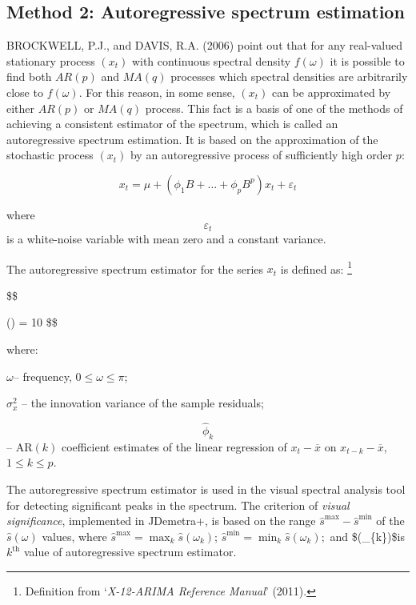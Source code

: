 \documentclass[
  letterpaper,
  DIV=11,
  numbers=noendperiod]{scrreprt}
\begin{document}
\hypertarget{method-2-autoregressive-spectrum-estimation}{%
\subsection{Method 2: Autoregressive spectrum
estimation}\label{method-2-autoregressive-spectrum-estimation}}

BROCKWELL, P.J., and DAVIS, R.A. (2006) point out that for any
real-valued stationary process \((x_{t})\) with continuous spectral
density \(f(\omega)\) it is possible to find both \(AR(p)\) and
\(MA(q)\) processes which spectral densities are arbitrarily close to
\(f(\omega)\). For this reason, in some sense, \((x_{t})\) can be
approximated by either \(AR(p)\) or \(MA(q)\) process. This fact is a
basis of one of the methods of achieving a consistent estimator of the
spectrum, which is called an autoregressive spectrum estimation. It is
based on the approximation of the stochastic process \((x_{t})\) by an
autoregressive process of sufficiently high order \(p\):

\[
  x_{t} = \mu + (\phi_{1}B + \ldots + \phi_{p}B^{p})x_{t} + \varepsilon_{t}
  \]

where \[\varepsilon_{t}\] is a white-noise variable with mean zero and a
constant variance.

The autoregressive spectrum estimator for the series \(x_{t}\) is
defined as: \footnote{Definition from `\emph{X-12-ARIMA Reference
  Manual}' (2011).}

\$\$

(\omega) =
10
\$\$

where:

\(\omega\)-- frequency, \(0 \leq \omega \leq \pi\);

\(\sigma_{x}^{2}\) -- the innovation variance of the sample residuals;

\[{\widehat{\phi}}_{k}\] -- \(\text{AR}(k)\) coefficient estimates of
the linear regression of \(x_{t} - \overline{x}\) on
\(x_{t - k} - \overline{x}\), \(1 \leq k \leq p\).

The autoregressive spectrum estimator is used in the visual spectral
analysis tool for detecting significant peaks in the spectrum. The
criterion of \emph{visual significance}, implemented in JDemetra+, is
based on the range \({\widehat{s}}^{\max} - {\widehat{s}}^{\min}\) of
the \(\widehat{s}(\omega)\) values, where
\({\widehat{s}}^{\max} = \max_{k}\widehat{s}(\omega_{k})\);
\({\widehat{s}}^{\min} = \min_{k}\widehat{s}(\omega_{k});\) and
\$(\omega\_\{k\})\$is \(k^{\text{th}}\) value of
autoregressive spectrum estimator.
\end{document}
